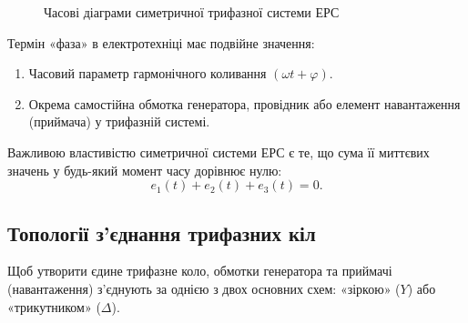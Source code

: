\documentclass[]{ConspectBook}
\begin{document}
\begin{figure}[h!]
	\centering
	\caption{Часові діаграми симетричної трифазної системи ЕРС}
	\label{pic:ThreePhaseWaveforms}
\end{figure}

Термін «фаза» в електротехніці має подвійне значення:
\begin{enumerate}
    \item Часовий параметр гармонічного коливання $(\omega t + \varphi)$.
    \item Окрема самостійна обмотка генератора, провідник або елемент навантаження (приймача) у трифазній системі.
\end{enumerate}

Важливою властивістю симетричної системи ЕРС є те, що сума її миттєвих значень у будь-який момент часу дорівнює нулю:
\begin{equation}
	e_1(t) + e_2(t) + e_3(t) = 0.
\end{equation}

\subsection*{Топології з'єднання трифазних кіл}

Щоб утворити єдине трифазне коло, обмотки генератора та приймачі (навантаження) з'єднують за однією з двох основних схем: «зіркою» ($Y$) або «трикутником» ($\Delta$).
\end{document}
